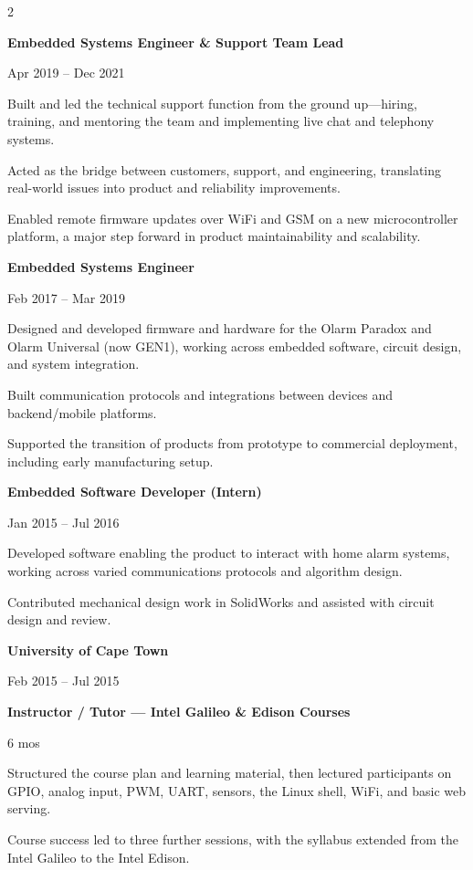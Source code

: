 \documentclass[10pt]{article}
\newcommand{\titledate}[3][10em]{%
  \par\noindent
  \parbox[t]{\dimexpr\linewidth-\leftskip-\rightskip-#1-0.6em\relax}{\raggedright #2}%
  \hfill
  \parbox[t]{#1}{\raggedleft #3}%
  \par
}
\newcommand{\company}[3]{%
  \par\vspace{0.6em}%
  \titledate{\bfseries\large\color{headtext} #1}{\small\color{emeraldlt} #3}%
  \vspace{1pt}{\small\color{maintext}\itshape #2}\par
}
\newcommand{\subrole}[2]{%
  \par\vspace{0.3em}%
  \titledate{\bfseries\color{maintext} #1}{\small\color{emeraldlt} #2}%
  \vspace{0.1em}%
}
\begin{document}
\begin{paracol}{2}
\begin{rightcolumn}
\subrole{Embedded Systems Engineer \& Support Team Lead}{Apr 2019 -- Dec 2021}
\begin{duties}
  \item Built and led the technical support function from the ground up---hiring, training, and mentoring the team and implementing live chat and telephony systems.
  \item Acted as the bridge between customers, support, and engineering, translating real-world issues into product and reliability improvements.
  \item Enabled remote firmware updates over WiFi and GSM on a new microcontroller platform, a major step forward in product maintainability and scalability.
\end{duties}

\subrole{Embedded Systems Engineer}{Feb 2017 -- Mar 2019}
\begin{duties}
  \item Designed and developed firmware and hardware for the Olarm Paradox and Olarm Universal (now GEN1), working across embedded software, circuit design, and system integration.
  \item Built communication protocols and integrations between devices and backend/mobile platforms.
  \item Supported the transition of products from prototype to commercial deployment, including early manufacturing setup.
\end{duties}

\subrole{Embedded Software Developer (Intern)}{Jan 2015 -- Jul 2016}
\begin{duties}
  \item Developed software enabling the product to interact with home alarm systems, working across varied communications protocols and algorithm design.
  \item Contributed mechanical design work in SolidWorks and assisted with circuit design and review.
\end{duties}

\company{University of Cape Town}{White Lab, Cape Town}{Feb 2015 -- Jul 2015}
\subrole{Instructor / Tutor --- Intel Galileo \& Edison Courses}{6 mos}
\begin{duties}
  \item Structured the course plan and learning material, then lectured participants on GPIO, analog input, PWM, UART, sensors, the Linux shell, WiFi, and basic web serving.
  \item Course success led to three further sessions, with the syllabus extended from the Intel Galileo to the Intel Edison.
\end{duties}


\end{rightcolumn}
\end{paracol}
\end{document}
